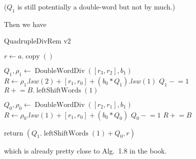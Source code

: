 \documentclass{computer-arithmetic}
\begin{document}
(\(Q_1\) is still potentially a double-word but not by much.)

Then we have

\begin{algorithm}
  \caption{QuadrupleDivRem v2}
  \begin{algorithmic}[1]
\State \(r ← a.\operatorname{copy}()\)

\State \(Q_1, ρ_1 ← \operatorname{DoubleWordDiv}([r_3, r_2], b_1)\)
\State \(R ← ρ_1.lsw(2) + [r_1, r_0] + (b_0 * Q_1).lsw(1)\)
\State \(Q_1 \mathrel{-}= 1\)
\State \(R \mathrel{+}= B.\operatorname{leftShiftWords}(1)\)
\EndWhile

\State \(Q_0, ρ_0 ← \operatorname{DoubleWordDiv}([r_2, r_1], b_1)\)
\State \(R ← ρ_0.lsw(1) + [r_1, r_0] + (b_0 * Q_0)\)
\State \(Q_0 \mathrel{-}= 1\)
\State \(R \mathrel{+}= B\)
\EndWhile

\State return \((Q_1.\operatorname{leftShiftWords}(1) + Q_0, r)\)
\end{algorithmic}
\end{algorithm}

which is already pretty close to Alg.~1.8 in the book.
\end{document}
